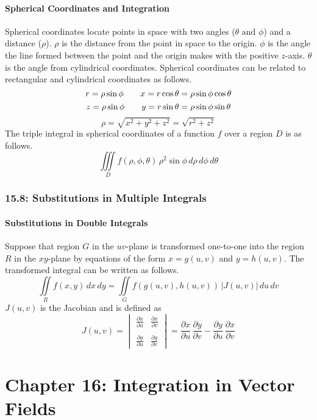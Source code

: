 \documentclass{article}
\begin{document}
\subsection*{Spherical Coordinates and Integration}
Spherical coordinates locate points in space with two angles (\(\theta \text{ and } \phi\)) and a distance (\(\rho\)). \(\rho\) is the distance from the point in space to the origin. \(\phi\) is the angle the line formed between the point and the origin makes with the positive \(z\)-axis. \(\theta\) is the angle from cylindrical coordinates. Spherical coordinates can be related to rectangular and cylindrical coordinates as follows.
\[r=\rho\sin\phi\hspace{7 mm}x=r\cos\theta=\rho\sin\phi\cos\theta\]
\[z=\rho\sin\phi\hspace{7 mm}y=r\sin\theta=\rho\sin\phi\sin\theta\]
\[\rho=\sqrt{x^2+y^2+z^2}=\sqrt{r^2+z^2}\]
The triple integral in spherical coordinates of a function \(f\) over a region \(D\) is as follows.
\[\iiint\limits_Df(\rho,\phi,\theta)\,\rho^2\sin\phi\,d\rho\,d\phi\,d\theta\]
\section*{15.8: Substitutions in Multiple Integrals}
\subsection*{Substitutions in Double Integrals}
Suppose that region \(G\) in the \(uv\)-plane is transformed one-to-one into the region \(R\) in the \(xy\)-plane by equations of the form \(x=g(u,v)\) and \(y=h(u,v)\). The transformed integral can be written as follows.
\[\iint\limits_Rf(x,y)\,dx\,dy=\iint\limits_Gf(g(u,v),h(u,v))\,|J(u,v)|\,du\,dv\]
\(J(u, v)\) is the Jacobian and is defined as
\[J(u,v)=\begin{vmatrix}
\frac{\partial x}{\partial u} & \frac{\partial x}{\partial v}\\\\
\frac{\partial y}{\partial u} & \frac{\partial y}{\partial v}
\end{vmatrix}=\frac{\partial x}{\partial u}\,\frac{\partial y}{\partial v}-\frac{\partial y}{\partial u}\,\frac{\partial x}{\partial v}\]
\part*{Chapter 16: Integration in Vector Fields}
\end{document}

